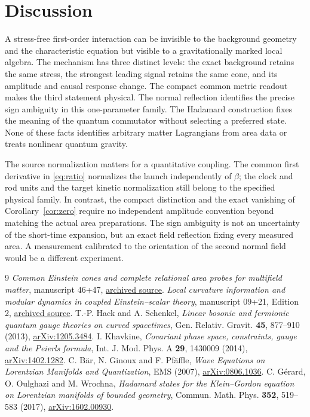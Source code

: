 \documentclass[11pt]{article}
\begin{document}
\clearpage
\section{Discussion}

A stress-free first-order interaction can be invisible to the background geometry and the characteristic equation but visible to a gravitationally marked local algebra. The mechanism has three distinct levels: the exact background retains the same stress, the strongest leading signal retains the same cone, and its amplitude and causal response change. The compact common metric readout makes the third statement physical. The normal reflection identifies the precise sign ambiguity in this one-parameter family. The Hadamard construction fixes the meaning of the quantum commutator without selecting a preferred state. None of these facts identifies arbitrary matter Lagrangians from area data or treats nonlinear quantum gravity.

The source normalization matters for a quantitative coupling. The common first derivative in \eqref{eq:ratio} normalizes the launch independently of $\beta$; the clock and rod units and the target kinetic normalization still belong to the specified physical family. In contrast, the compact distinction and the exact vanishing of Corollary~\ref{cor:zero} require no independent amplitude convention beyond matching the actual area preparations. The sign ambiguity is not an uncertainty of the short-time expansion, but an exact field reflection fixing every measured area. A measurement calibrated to the orientation of the second normal field would be a different experiment.

\begin{thebibliography}{9}
 \emph{Common Einstein cones and complete relational area probes for multifield matter}, manuscript 46+47, \href{https://github.com/g3173028019-beep/ai-automated-quantum-gravity-research/tree/main/papers/46-47-common-cones-and-area-probes}{archived source}.
 \emph{Local curvature information and modular dynamics in coupled Einstein--scalar theory}, manuscript 09+21, Edition 2, \href{https://github.com/g3173028019-beep/ai-automated-quantum-gravity-research/tree/main/papers/09-21-coupled-modular-kernel}{archived source}.
 T.-P. Hack and A. Schenkel, \emph{Linear bosonic and fermionic quantum gauge theories on curved spacetimes}, Gen. Relativ. Gravit. \textbf{45}, 877--910 (2013), \href{https://arxiv.org/abs/1205.3484}{arXiv:1205.3484}.
 I. Khavkine, \emph{Covariant phase space, constraints, gauge and the Peierls formula}, Int. J. Mod. Phys. A \textbf{29}, 1430009 (2014), \href{https://arxiv.org/abs/1402.1282}{arXiv:1402.1282}.
 C. B\"ar, N. Ginoux and F. Pf\"affle, \emph{Wave Equations on Lorentzian Manifolds and Quantization}, EMS (2007), \href{https://arxiv.org/abs/0806.1036}{arXiv:0806.1036}.
 C. G\'erard, O. Oulghazi and M. Wrochna, \emph{Hadamard states for the Klein--Gordon equation on Lorentzian manifolds of bounded geometry}, Commun. Math. Phys. \textbf{352}, 519--583 (2017), \href{https://arxiv.org/abs/1602.00930}{arXiv:1602.00930}.
\end{thebibliography}
\end{document}
